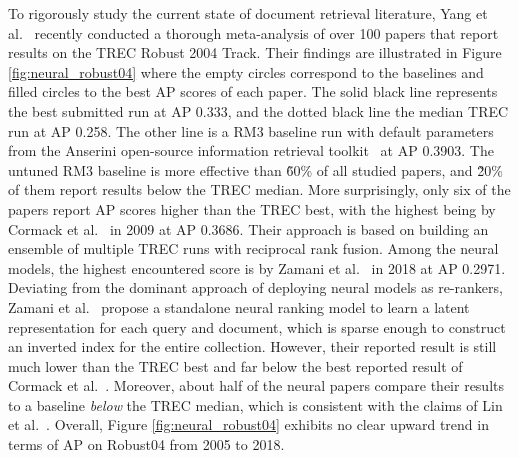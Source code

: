 To rigorously study the current state of document retrieval literature, Yang et al.~\cite{Yang_etal_SIGIR2019} recently conducted a thorough meta-analysis of over 100 papers that report results on the TREC Robust 2004 Track.
Their findings are illustrated in Figure \ref{fig:neural_robust04} where the empty circles correspond to the baselines and filled circles to the best AP scores of each paper.
The solid black line represents the best submitted run at AP 0.333, and the dotted black line the median TREC run at AP 0.258.
The other line is a RM3 baseline run with default parameters from the Anserini open-source information retrieval toolkit~\cite{Yang_etal_SIGIR2017, Yang:2018:ARR:3289400.3239571} at AP 0.3903.
The untuned RM3 baseline is more effective than \~60\% of all studied papers, and \~20\% of them report results below the TREC median.
More surprisingly, only six of the papers report AP scores higher than the TREC best, with the highest being by Cormack et al.~\cite{Cormack:2009:RRF:1571941.1572114} in 2009 at AP 0.3686.
Their approach is based on building an ensemble of multiple TREC runs with reciprocal rank fusion.
Among the neural models, the highest encountered score is by Zamani et al.~\cite{zamani2018neural} in 2018 at AP 0.2971.
Deviating from the dominant approach of deploying neural models as re-rankers, Zamani et al.~\cite{zamani2018neural} propose a standalone neural ranking model to learn a latent representation for each query and document, which is sparse enough to construct an inverted index for the entire collection.
However, their reported result is still much lower than the TREC best and far below the best reported result of Cormack et al.~\cite{Cormack:2009:RRF:1571941.1572114}.
Moreover, about half of the neural papers compare their results to a baseline \textit{below} the TREC median, which is consistent with the claims of Lin et al.~\cite{lin2019neural}.
Overall, Figure \ref{fig:neural_robust04} exhibits no clear upward trend in terms of AP on Robust04 from 2005 to 2018.


